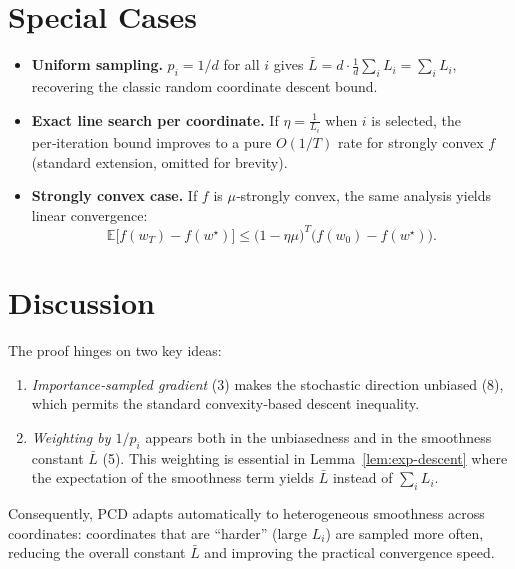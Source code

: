 \documentclass{article}
\newcommand{\E}{\mathbb{E}}
\begin{document}
\section*{Special Cases}
\begin{itemize}
\item \textbf{Uniform sampling.} $p_i=1/d$ for all $i$ gives $\bar L = d\cdot\frac{1}{d}\sum_i L_i = \sum_i L_i$, recovering the classic random coordinate descent bound.
\item \textbf{Exact line search per coordinate.} If $\eta=\frac{1}{L_i}$ when $i$ is selected, the per‑iteration bound improves to a pure $O(1/T)$ rate for strongly convex $f$ (standard extension, omitted for brevity).
\item \textbf{Strongly convex case.} If $f$ is $\mu$‑strongly convex, the same analysis yields linear convergence:
\[
\E\!\big[f(w_T)-f(w^\star)\big]\le
\big(1-\eta\mu\big)^{T}\big(f(w_0)-f(w^\star)\big).
\]
\end{itemize}

\section*{Discussion}
The proof hinges on two key ideas:

\begin{enumerate}
\item \emph{Importance‑sampled gradient} (3) makes the stochastic direction unbiased (8), which permits the standard convexity‑based descent inequality.
\item \emph{Weighting by $1/p_i$} appears both in the unbiasedness and in the smoothness constant $\bar L$ (5). This weighting is essential in Lemma~\ref{lem:exp-descent} where the expectation of the smoothness term yields $\bar L$ instead of $\sum_i L_i$.
\end{enumerate}

Consequently, PCD adapts automatically to heterogeneous smoothness across coordinates: coordinates that are ``harder'' (large $L_i$) are sampled more often, reducing the overall constant $\bar L$ and improving the practical convergence speed.
\end{document}
